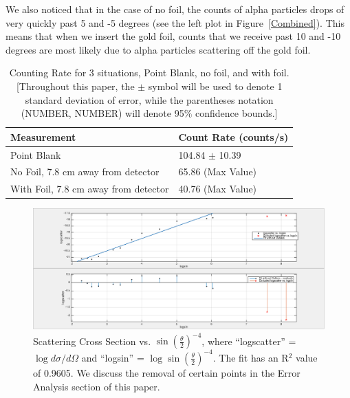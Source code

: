 We also noticed that in the case of no foil, the counts of alpha particles drops of very quickly past 5 and -5 degrees (see the left plot in Figure~\ref{Combined}). This means that when we insert the gold foil, counts that we receive past 10 and -10 degrees are most likely due to alpha particles scattering off the gold foil.

\begin{table}[h]
  \begin{tabular}{|l|l|}
  \hline 
  Measurement & Count Rate (counts/s)                \\ \hline \hline
  Point Blank & 104.84 $\pm$ 10.39                        \\
  No Foil, 7.8 cm away from detector & 65.86 (Max Value)    \\
  With Foil, 7.8 cm away from detector & 40.76 (Max Value)  \\ \hline         
  \end{tabular}
  \caption{Counting Rate for 3 situations, Point Blank, no foil, and with foil.[\footnotesize{Throughout this paper, the $\pm$ symbol will be used to denote 1 standard deviation of error, while the parentheses notation (NUMBER, NUMBER) will denote 95$\%$ confidence bounds.}]}
  \label{PointBlank}
\end{table}

\begin{figure}[t]
  \includegraphics[width=\textwidth]{FitforScatteringCrossSection.png}
  \begin{center}
  \caption{Scattering Cross Section vs. $ \sin(\frac{\theta}{2})^{-4}$, where ``logscatter'' = $\log{d \sigma / d \Omega}$ and ``logsin'' = $\log{\sin(\frac{\theta}{2})^{-4}}$. The fit has an R$^2$ value of 0.9605. We discuss the removal of certain points in the Error Analysis section of this paper.}
  \label{FitforScatteringCrossSection}
  \end{center}
\end{figure}

